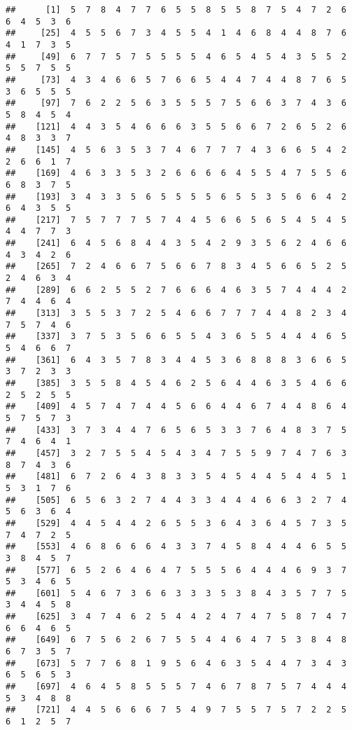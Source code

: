 \documentclass[
]{book}
\begin{document}
\begin{verbatim}
##      [1]  5  7  8  4  7  7  6  5  5  8  5  5  8  7  5  4  7  2  6  6  4  5  3  6
##     [25]  4  5  5  6  7  3  4  5  5  4  1  4  6  8  4  4  8  7  6  4  1  7  3  5
##     [49]  6  7  7  5  7  5  5  5  5  4  6  5  4  5  4  3  5  5  2  5  5  7  5  5
##     [73]  4  3  4  6  6  5  7  6  6  5  4  4  7  4  4  8  7  6  5  3  6  5  5  5
##     [97]  7  6  2  2  5  6  3  5  5  5  7  5  6  6  3  7  4  3  6  5  8  4  5  4
##    [121]  4  4  3  5  4  6  6  6  3  5  5  6  6  7  2  6  5  2  6  4  8  3  3  7
##    [145]  4  5  6  3  5  3  7  4  6  7  7  7  4  3  6  6  5  4  2  2  6  6  1  7
##    [169]  4  6  3  3  5  3  2  6  6  6  6  4  5  5  4  7  5  5  6  6  8  3  7  5
##    [193]  3  4  3  3  5  6  5  5  5  5  6  5  5  3  5  6  6  4  2  6  4  3  5  5
##    [217]  7  5  7  7  7  5  7  4  4  5  6  6  5  6  5  4  5  4  5  4  4  7  7  3
##    [241]  6  4  5  6  8  4  4  3  5  4  2  9  3  5  6  2  4  6  6  4  3  4  2  6
##    [265]  7  2  4  6  6  7  5  6  6  7  8  3  4  5  6  6  5  2  5  2  4  6  3  4
##    [289]  6  6  2  5  5  2  7  6  6  6  4  6  3  5  7  4  4  4  2  7  4  4  6  4
##    [313]  3  5  5  3  7  2  5  4  6  6  7  7  7  4  4  8  2  3  4  7  5  7  4  6
##    [337]  3  7  5  3  5  6  6  5  5  4  3  6  5  5  4  4  4  6  5  5  4  6  6  7
##    [361]  6  4  3  5  7  8  3  4  4  5  3  6  8  8  8  3  6  6  5  3  7  2  3  3
##    [385]  3  5  5  8  4  5  4  6  2  5  6  4  4  6  3  5  4  6  6  2  5  2  5  5
##    [409]  4  5  7  4  7  4  4  5  6  6  4  4  6  7  4  4  8  6  4  5  7  5  7  3
##    [433]  3  7  3  4  4  7  6  5  6  5  3  3  7  6  4  8  3  7  5  7  4  6  4  1
##    [457]  3  2  7  5  5  4  5  4  3  4  7  5  5  9  7  4  7  6  3  8  7  4  3  6
##    [481]  6  7  2  6  4  3  8  3  3  5  4  5  4  4  5  4  4  5  1  5  3  1  7  6
##    [505]  6  5  6  3  2  7  4  4  3  3  4  4  4  6  6  3  2  7  4  5  6  3  6  4
##    [529]  4  4  5  4  4  2  6  5  5  3  6  4  3  6  4  5  7  3  5  7  4  7  2  5
##    [553]  4  6  8  6  6  6  4  3  3  7  4  5  8  4  4  4  6  5  5  3  8  4  5  7
##    [577]  6  5  2  6  4  6  4  7  5  5  5  6  4  4  4  6  9  3  7  5  3  4  6  5
##    [601]  5  4  6  7  3  6  6  3  3  3  5  3  8  4  3  5  7  7  5  3  4  4  5  8
##    [625]  3  4  7  4  6  2  5  4  4  2  4  7  4  7  5  8  7  4  7  6  6  4  6  5
##    [649]  6  7  5  6  2  6  7  5  5  4  4  6  4  7  5  3  8  4  8  6  7  3  5  7
##    [673]  5  7  7  6  8  1  9  5  6  4  6  3  5  4  4  7  3  4  3  6  5  6  5  3
##    [697]  4  6  4  5  8  5  5  5  7  4  6  7  8  7  5  7  4  4  4  5  3  4  8  8
##    [721]  4  4  5  6  6  6  7  5  4  9  7  5  5  7  5  7  2  2  5  6  1  2  5  7

\end{verbatim}
\end{document}
